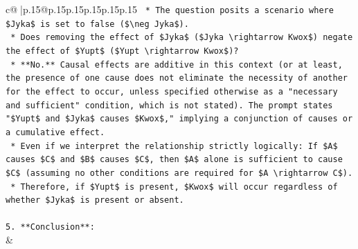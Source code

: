\documentclass{article}
\begin{document}
{\begin{supertabular}{c@{$\;$}|p{.15\linewidth}@{}p{.15\linewidth}p{.15\linewidth}p{.15\linewidth}p{.15\linewidth}p{.15\linewidth}}
{{{\texttt{    *   The question posits a scenario where \$Jyka\$ is set to false (\$\textbackslash{}neg Jyka\$).} \\
\texttt{    *   Does removing the effect of \$Jyka\$ (\$Jyka \textbackslash{}rightarrow Kwox\$) negate the effect of \$Yupt\$ (\$Yupt \textbackslash{}rightarrow Kwox\$)?} \\
\texttt{    *   **No.** Causal effects are additive in this context (or at least, the presence of one cause does not eliminate the necessity of another for the effect to occur, unless specified otherwise as a "necessary and sufficient" condition, which is not stated). The prompt states "\$Yupt\$ and \$Jyka\$ causes \$Kwox\$," implying a conjunction of causes or a cumulative effect.} \\
\texttt{    *   Even if we interpret the relationship strictly logically: If \$A\$ causes \$C\$ and \$B\$ causes \$C\$, then \$A\$ alone is sufficient to cause \$C\$ (assuming no other conditions are required for \$A \textbackslash{}rightarrow C\$).} \\
\texttt{    *   Therefore, if \$Yupt\$ is present, \$Kwox\$ will occur regardless of whether \$Jyka\$ is present or absent.} \\
\\ 
\texttt{5.  **Conclusion**:} \\
            }
        }
    }
    & \\ \\


\end{supertabular}}
\end{document}
